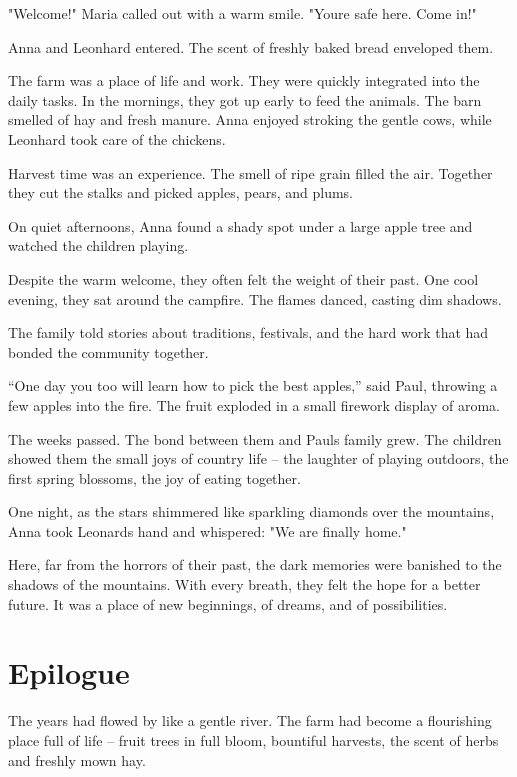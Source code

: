 \documentclass[
]{article}
\begin{document}
"Welcome!" Maria called out with a warm smile. "You\textquotesingle re safe here. Come in!"

Anna and Leonhard entered. The scent of freshly baked bread enveloped them.

The farm was a place of life and work. They were quickly integrated into the daily tasks. In the mornings, they got up early to feed the animals. The barn smelled of hay and fresh manure. Anna enjoyed stroking the gentle cows, while Leonhard took care of the chickens.

Harvest time was an experience. The smell of ripe grain filled the air. Together they cut the stalks and picked apples, pears, and plums.

On quiet afternoons, Anna found a shady spot under a large apple tree and watched the children playing.

Despite the warm welcome, they often felt the weight of their past. One cool evening, they sat around the campfire. The flames danced, casting dim shadows.

The family told stories about traditions, festivals, and the hard work that had bonded the community together.

``One day you too will learn how to pick the best apples,'' said Paul, throwing a few apples into the fire. The fruit exploded in a small firework display of aroma.

The weeks passed. The bond between them and Paul\textquotesingle s family grew. The children showed them the small joys of country life -- the laughter of playing outdoors, the first spring blossoms, the joy of eating together.

One night, as the stars shimmered like sparkling diamonds over the mountains, Anna took Leonard\textquotesingle s hand and whispered: "We are finally home."

Here, far from the horrors of their past, the dark memories were banished to the shadows of the mountains. With every breath, they felt the hope for a better future. It was a place of new beginnings, of dreams, and of possibilities.

\section{Epilogue}\label{epilogue}

The years had flowed by like a gentle river. The farm had become a flourishing place full of life -- fruit trees in full bloom, bountiful harvests, the scent of herbs and freshly mown hay.
\end{document}
